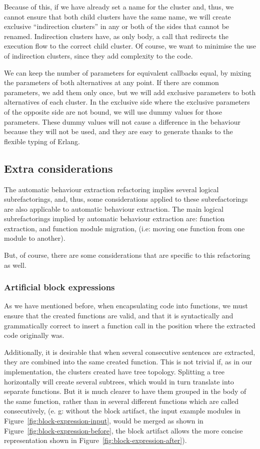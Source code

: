 Because of this, if we have already set a name for the cluster and,
thus, we cannot ensure that both child clusters have the same name,
we will create exclusive ``indirection clusters'' in any or both
of the sides that cannot be renamed. Indirection clusters have, as
only body, a call that redirects the execution flow to the correct
child cluster. Of course, we want to minimise the use of indirection
clusters, since they add complexity to the code.

We can keep the number of parameters for equivalent callbacks equal,
by mixing the parameters of both alternatives at any point. If there
are common parameters, we add them only once, but we will add exclusive
parameters to both alternatives of each cluster. In the exclusive
side where the exclusive parameters of the opposite side are not bound,
we will use dummy values for those parameters. These dummy values
will not cause a difference in the behaviour because they will not
be used, and they are easy to generate thanks to the flexible typing
of Erlang.

\subsection{Extra considerations}

The automatic behaviour extraction refactoring implies several logical
subrefactorings, and, thus, some considerations applied to these subrefactorings
are also applicable to automatic behaviour extraction. The main logical
subrefactorings implied by automatic behaviour extraction are: function
extraction, and function module migration, (i.e: moving one function
from one module to another).

But, of course, there are some considerations that are specific to
this refactoring as well.

\subsubsection{Artificial block expressions\label{sub:artificial-block-expressions}}

As we have mentioned before, when encapsulating code into functions,
we must ensure that the created functions are valid, and that it is
syntactically and grammatically correct to insert a function call
in the position where the extracted code originally was.

Additionally, it is desirable that when several consecutive sentences
are extracted, they are combined into the same created function. This
is not trivial if, as in our implementation, the clusters created
have tree topology. Splitting a tree horizontally will create several
subtrees, which would in turn translate into separate functions. But
it is much clearer to have them grouped in the body of the same function,
rather than in several different functions which are called consecutively,
(e. g: without the block artifact, the input example modules in Figure~\ref{fig:block-expression-input},
would be merged as shown in Figure~\ref{fig:block-expression-before},
the block artifact allows the more concise representation shown in
Figure~\ref{fig:block-expression-after}).

